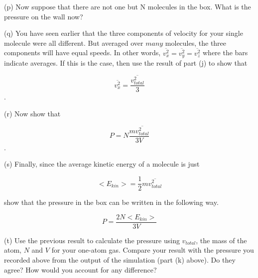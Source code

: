 (p) Now suppose that there are not one but N molecules in the box. What
is the pressure on the wall now?
\vspace{20mm}

(q) You have seen earlier that the three components of velocity for your single molecule were all different.  But averaged over $many$ molecules, the three components will have equal speeds.  In other words, \( \overline{v_{x}^{2}}=\overline{v_{y}^{2}}=\overline{v_{z}^{2}} \) where the bars indicate averages. If this is the case, then use the result of part (j) to show that

\[
\overline{v_{x}^{2}}=\frac{\overline{v_{total}^{2}}}{3}\].


(r) Now show that 

\[
P=N\frac{m\overline{v_{total}^{2}}}{3V}\].

\vspace{20mm}

(s) Finally, since the average kinetic energy of a molecule is just

\[
<E_{kin}>=\frac{1}{2}m\overline{v_{total}^{2}}\]


show that the pressure in the box can be written in the following
way.

\[
P=\frac{2N<E_{kin}>}{3V}\]
\vspace{20mm}

(t) Use the previous result to calculate the pressure using $v_{total}$, the mass of the atom, $N$ and $V$ for your one-atom gas. Compare your result with the pressure you recorded above from the output of the simulation (part (k) above).
Do they agree? How would you account for any difference?
\vspace{20mm}
